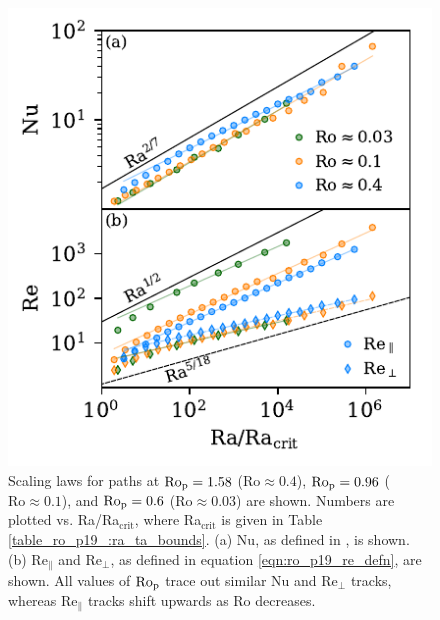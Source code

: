 \begin{figure}[p!]
    \includegraphics[width=\textwidth]{./figs/nu_and_re.pdf}
    \caption[Scaling of Nusselt and Reynolds numbers on fixed Predictive Rossby paths.]
	{
	Scaling laws for paths at $\text{Ro}_{\text{p}} = 1.58$ ($\text{Ro} \approx 0.4$),
    $\text{Ro}_{\text{p}} = 0.96$ ($\text{Ro} \approx 0.1$), and $\text{Ro}_{\text{p}} = 0.6$ ($\text{Ro} \approx 0.03$) are shown. 
    Numbers are plotted vs. Ra/Ra$_{\text{crit}}$, where Ra$_{\text{crit}}$ is given in Table \ref{table_ro_p19_:ra_ta_bounds}.
	(a) Nu, as defined in \AB, is shown.
    (b) $\text{Re}_\parallel$ and $\text{Re}_{\perp}$, as defined in equation \ref{eqn:ro_p19_re_defn},
	are shown. All values of $\text{Ro}_{\text{p}}$ trace out similar Nu and $\text{Re}_{\perp}$ tracks,
	whereas $\text{Re}_\parallel$ tracks shift upwards as Ro decreases.
    \label{fig:nu_and_re} }
\end{figure}

